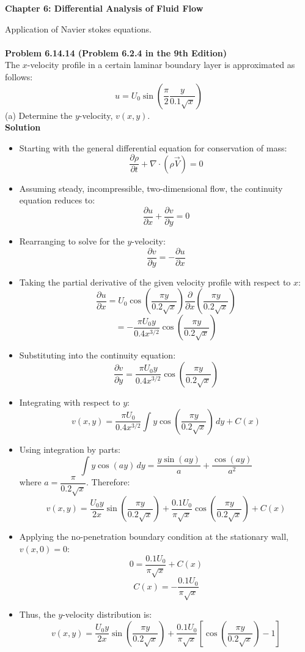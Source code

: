 ﻿\documentclass[12pt]{article}
\begin{document}
\begin{center}
    {\LARGE\bfseries Chapter 6: Differential Analysis of Fluid Flow\par}
\end{center}
Application of Navier stokes equations.\\\\
\textbf{Problem 6.14.14 (Problem 6.2.4 in the 9th Edition)}\\
The $x$-velocity profile in a certain laminar boundary layer is approximated as follows:
\[u=U_0\sin\left(\frac{\pi}{2}\frac{y}{0.1\sqrt{x}}\right)\]
(a) Determine the $y$-velocity, $v(x,y)$.\\
\textbf{Solution}
\begin{itemize}
    \item Starting with the general differential equation for conservation of mass:
    \[\frac{\partial\rho}{\partial t}+\nabla\cdot(\rho\vec{V})=0\]
    \item Assuming steady, incompressible, two-dimensional flow, the continuity equation reduces to:
    \[\frac{\partial u}{\partial x}+\frac{\partial v}{\partial y}=0\]
    \item Rearranging to solve for the $y$-velocity:
    \[\frac{\partial v}{\partial y}=-\frac{\partial u}{\partial x}\]
    \item Taking the partial derivative of the given velocity profile with respect to $x$:
    \[\frac{\partial u}{\partial x}=U_0\cos\left(\frac{\pi y}{0.2\sqrt{x}}\right)\frac{\partial}{\partial x}\left(\frac{\pi y}{0.2\sqrt{x}}\right)\]
    \[=-\frac{\pi U_0y}{0.4x^{3/2}}\cos\left(\frac{\pi y}{0.2\sqrt{x}}\right)\]
    \item Substituting into the continuity equation:
    \[\frac{\partial v}{\partial y}=\frac{\pi U_0y}{0.4x^{3/2}}\cos\left(\frac{\pi y}{0.2\sqrt{x}}\right)\]
    \item Integrating with respect to $y$:
    \[v(x,y)=\frac{\pi U_0}{0.4x^{3/2}}\int y\cos\left(\frac{\pi y}{0.2\sqrt{x}}\right)\,dy+C(x)\]
    \item Using integration by parts:
    \[\int y\cos(ay)\,dy=\frac{y\sin(ay)}{a}+\frac{\cos(ay)}{a^2}\]
    where $a=\dfrac{\pi}{0.2\sqrt{x}}$. Therefore:
    \[v(x,y)=\frac{U_0y}{2x}\sin\left(\frac{\pi y}{0.2\sqrt{x}}\right)+\frac{0.1U_0}{\pi\sqrt{x}}\cos\left(\frac{\pi y}{0.2\sqrt{x}}\right)+C(x)\]
    \item Applying the no-penetration boundary condition at the stationary wall, $v(x,0)=0$:
    \[0=\frac{0.1U_0}{\pi\sqrt{x}}+C(x)\]
    \[C(x)=-\frac{0.1U_0}{\pi\sqrt{x}}\]
    \item Thus, the $y$-velocity distribution is:
    \[\boxed{v(x,y)=\frac{U_0y}{2x}\sin\left(\frac{\pi y}{0.2\sqrt{x}}\right)+\frac{0.1U_0}{\pi\sqrt{x}}\left[\cos\left(\frac{\pi y}{0.2\sqrt{x}}\right)-1\right]}\]
\end{itemize}
\end{document}
